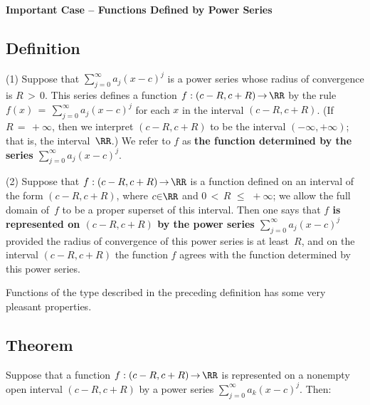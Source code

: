 \V
\V

        {\bf Important Case -- Functions Defined by Power Series}

\V

        \subsection{\small{{\bf Definition}}}
        \label{DefG60.70}

\V

        \hspace*{\parindent}(1) Suppose that $\sum_{j=0}^{{\infty}} a_{j}(x-c)^{j}$ is a power series whose radius of convergence is $R\,>\,0$.
    This series defines a function $f:(c-R,c+R) \,{\rightarrow}\, {\RR}$ by the rule $f(x) \,=\, \sum_{j=0}^{{\infty}} a_{j}(x-c)^{j}$ for each $x$ in the interval $(c-R, c+R)$.
    (If $R \,=\, +{\infty}$, then we interpret $(c-R,c+R)$ to be the interval $(-{\infty},+{\infty})$; that is, the interval~${\RR}$.)
    We refer to $f$ as {\bf the function determined by the series $\sum_{j=0}^{{\infty}} a_{j}(x-c)^{j}$}.

\V

            (2) Suppose that $f:(c-R,c+R) \,{\rightarrow}\, {\RR}$ is a function defined on an interval of the form $(c-R,c+R)$,
    where $c{\in}{\RR}$ and $0\,<\,R\,\,{\leq}\,\,+{\infty}$; we allow the full domain of~$f$ to be a proper superset of this interval.
    Then one says that {\bf $f$ is represented on $(c-R,c+R)$ by the power series $\sum_{j=0}^{{\infty}} a_{j}(x-c)^{j}$}
    provided the radius of convergence of this power series is at least~$R$, and on the interval $(c-R,c+R)$ the function $f$ agrees with the function determined by this power series.

\V

        Functions of the type described in the preceding definition has some very pleasant properties.

\V

        \subsection{\small{{\bf Theorem}}}
        \label{ThmG60.80}

\V

        Suppose that a function $f:(c-R,c+R) \,{\rightarrow}\, {\RR}$ is represented on a nonempty open interval $(c-R,c+R)$ by a power series $\sum_{j=0}^{{\infty}} a_{k}(x-c)^{j}$.
    Then:

\V

